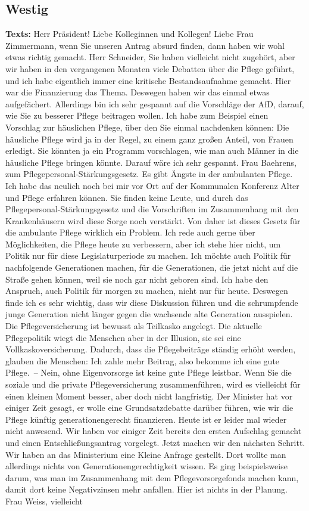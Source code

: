 \documentclass{article}
\begin{document}
\subsection{Westig}
\noindent\textbf{Texts:} Herr Präsident! Liebe Kolleginnen und Kollegen! Liebe Frau Zimmermann, wenn Sie unseren Antrag absurd finden, dann haben wir wohl etwas richtig gemacht.  Herr Schneider, Sie haben vielleicht nicht zugehört, aber wir haben in den vergangenen Monaten viele Debatten über die Pflege geführt, und ich habe eigentlich immer eine kritische Bestandsaufnahme gemacht. Hier war die Finanzierung das Thema. Deswegen haben wir das einmal etwas aufgefächert. Allerdings bin ich sehr gespannt auf die Vorschläge der AfD, darauf, wie Sie zu besserer Pflege beitragen wollen.  Ich habe zum Beispiel einen Vorschlag zur häuslichen Pflege, über den Sie einmal nachdenken können: Die häusliche Pflege wird ja in der Regel, zu einem ganz großen Anteil, von Frauen erledigt. Sie könnten ja ein Programm vorschlagen, wie man auch Männer in die häusliche Pflege bringen könnte.  Darauf wäre ich sehr gespannt.  Frau Baehrens, zum Pflegepersonal-Stärkungsgesetz. Es gibt Ängste in der ambulanten Pflege. Ich habe das neulich noch bei mir vor Ort auf der Kommunalen Konferenz Alter und Pflege erfahren können. Sie finden keine Leute, und durch das Pflegepersonal-Stärkungsgesetz und die Vorschriften im Zusammenhang mit den Krankenhäusern wird diese Sorge noch verstärkt.  Von daher ist dieses Gesetz für die ambulante Pflege wirklich ein Problem.  Ich rede auch gerne über Möglichkeiten, die Pflege heute zu verbessern, aber ich stehe hier nicht, um Politik nur für diese Legislaturperiode zu machen. Ich möchte auch Politik für nachfolgende Generationen machen,  für die Generationen, die jetzt nicht auf die Straße gehen können, weil sie noch gar nicht geboren sind. Ich habe den Anspruch, auch Politik für morgen zu machen, nicht nur für heute. Deswegen finde ich es sehr wichtig, dass wir diese Diskussion führen und die schrumpfende junge Generation nicht länger gegen die wachsende alte Generation ausspielen.  Die Pflegeversicherung ist bewusst als Teilkasko angelegt. Die aktuelle Pflegepolitik wiegt die Menschen aber in der Illusion, sie sei eine Vollkaskoversicherung. Dadurch, dass die Pflegebeiträge ständig erhöht werden, glauben die Menschen: Ich zahle mehr Beitrag, also bekomme ich eine gute Pflege. – Nein, ohne Eigenvorsorge ist keine gute Pflege leistbar.  Wenn Sie die soziale und die private Pflegeversicherung zusammenführen, wird es vielleicht für einen kleinen Moment besser, aber doch nicht langfristig.  Der Minister hat vor einiger Zeit gesagt, er wolle eine Grundsatzdebatte darüber führen, wie wir die Pflege künftig generationengerecht finanzieren. Heute ist er leider mal wieder nicht anwesend.  Wir haben vor einiger Zeit bereits den ersten Aufschlag gemacht und einen Entschließungsantrag vorgelegt. Jetzt machen wir den nächsten Schritt. Wir haben an das Ministerium eine Kleine Anfrage gestellt. Dort wollte man allerdings nichts von Generationengerechtigkeit wissen. Es ging beispielsweise darum, was man im Zusammenhang mit dem Pflegevorsorgefonds machen kann, damit dort keine Negativzinsen mehr anfallen. Hier ist nichts in der Planung. Frau Weiss, vielleicht 
\end{document}
